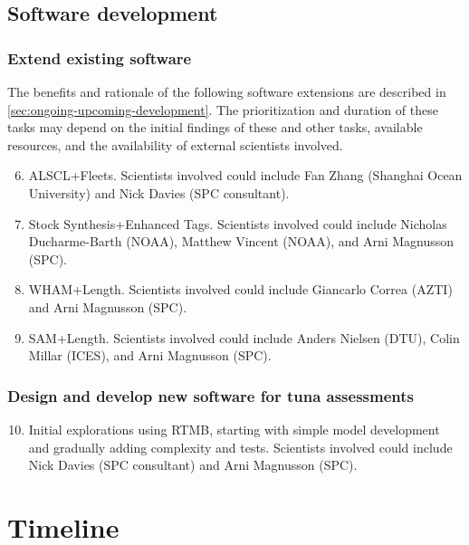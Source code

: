 \documentclass{SCreport}
\begin{document}
\subsection{Software development}

\subsubsection{Extend existing software}

The benefits and rationale of the following software extensions are described in
\autoref{sec:ongoing-upcoming-development}. The prioritization and duration of
these tasks may depend on the initial findings of these and other tasks,
available resources, and the availability of external scientists involved.

\begin{enumerate}\setcounter{enumi}{5}
  \item ALSCL+Fleets. Scientists involved could include Fan Zhang (Shanghai
  Ocean University) and Nick Davies (SPC consultant).
  \item Stock Synthesis+Enhanced Tags. Scientists involved could include
  Nicholas Ducharme-Barth (NOAA), Matthew Vincent (NOAA), and Arni Magnusson
  (SPC).
  \item WHAM+Length. Scientists involved could include Giancarlo Correa (AZTI)
  and Arni Magnusson (SPC).
  \item SAM+Length. Scientists involved could include Anders Nielsen (DTU),
  Colin Millar (ICES), and Arni Magnusson (SPC).
\end{enumerate}

\subsubsection{Design and develop new software for tuna assessments}

\begin{enumerate}\setcounter{enumi}{9}
  \item Initial explorations using RTMB, starting with simple model development
  and gradually adding complexity and tests. Scientists involved could include
  Nick Davies (SPC consultant) and Arni Magnusson (SPC).
\end{enumerate}

\section{Timeline}
\end{document}
